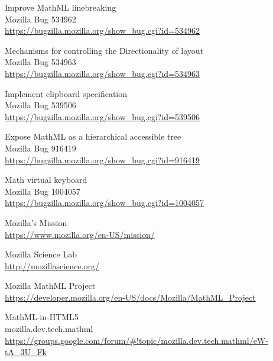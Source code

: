 \begin{thebibliography}{8}

Improve MathML linebreaking  \\
Mozilla Bug 534962 \\
\href{https://bugzilla.mozilla.org/show_bug.cgi?id=534962}{https://bugzilla.mozilla.org/show\_bug.cgi?id=534962}

Mechanisms for controlling the Directionality of layout \\
Mozilla Bug 534963 \\
\href{https://bugzilla.mozilla.org/show_bug.cgi?id=534963}{https://bugzilla.mozilla.org/show\_bug.cgi?id=534963}

Implement clipboard specification \\
Mozilla Bug 539506 \\
\href{https://bugzilla.mozilla.org/show_bug.cgi?id=539506}{https://bugzilla.mozilla.org/show\_bug.cgi?id=539506}

Expose MathML as a hierarchical accessible tree \\
Mozilla Bug 916419 \\
\href{https://bugzilla.mozilla.org/show_bug.cgi?id=916419}{https://bugzilla.mozilla.org/show\_bug.cgi?id=916419}

Math virtual keyboard \\
Mozilla Bug 1004057 \\
\href{https://bugzilla.mozilla.org/show_bug.cgi?id=1004057}{https://bugzilla.mozilla.org/show\_bug.cgi?id=1004057}

Mozilla's Mission \\
\href{https://www.mozilla.org/en-US/mission/}{https://www.mozilla.org/en-US/mission/}

Mozilla Science Lab \\
\href{http://mozillascience.org/}{http://mozillascience.org/}

Mozilla MathML Project \\
\href{https://developer.mozilla.org/en-US/docs/Mozilla/MathML_Project}{https://developer.mozilla.org/en-US/docs/Mozilla/MathML\_Project}

MathML-in-HTML5 \\
mozilla.dev.tech.mathml \\
\href{https://groups.google.com/forum/#!topic/mozilla.dev.tech.mathml/eW-tA_3U_Fk}{https://groups.google.com/forum/\#!topic/mozilla.dev.tech.mathml/eW-tA\_3U\_Fk}


\end{thebibliography}
